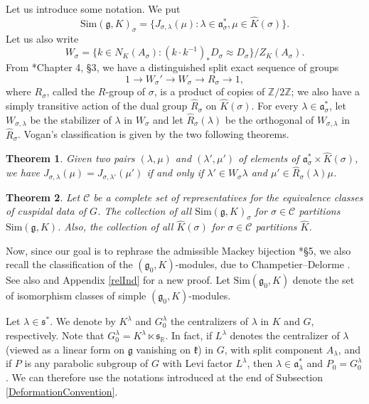 \documentclass{amsart}
\newtheorem{theorem}{Theorem}[section]
\theoremstyle{definition}
\begin{document}
Let us introduce some notation. We put \begin{equation}\label{notation_SgKsigma}\mathrm{Sim}(\mathfrak{g},K)_\sigma = \{J_{\sigma,\lambda}(\mu) : \lambda \in \mathfrak{a}_\sigma^*, \mu \in \widehat{K}(\sigma) \}.\end{equation}
Let us also write
\[W_\sigma = \{k \in N_K(A_\sigma) : (k\cdot k^{-1})_\ast D_\sigma \approx D_\sigma\}/Z_K(A_\sigma).\]
From \cite{VoganGreen}*{Chapter 4, §3}, we have a distinguished split exact sequence of groups
\[1 \to W_\sigma' \to W_\sigma \to R_\sigma \to 1, \]
where $R_\sigma$, called the $R$-group of $\sigma$, is a product of copies of $\mathbb{Z}/2\mathbb{Z}$; we also have a simply transitive action of the dual group $\hat{R}_\sigma$ on $\widehat{K}(\sigma)$. For every $\lambda \in \mathfrak{a}_\sigma^*$, let $W_{\sigma, \lambda}$ be the stabilizer of $\lambda$ in $W_\sigma$ and let $\hat{R}_\sigma(\lambda)$ be the orthogonal of $W_{\sigma, \lambda}$ in $\hat{R}_\sigma$. Vogan's classification is given by the two following theorems.

\begin{theorem}\label{vogan_classification} Given two pairs $(\lambda, \mu)$ and $(\lambda', \mu')$ of elements of $\mathfrak{a}_\sigma^* \times \widehat{K}(\sigma)$, we have $J_{\sigma,\lambda}(\mu) = J_{\sigma,\lambda'}(\mu')$ if and only if $\lambda' \in W_\sigma\lambda$ and $\mu' \in \hat{R}_\sigma(\lambda) \mu$.
\end{theorem}

\begin{theorem}\label{partition}
    Let $\mathcal{C}$ be a complete set of representatives for the equivalence classes of cuspidal data of $G$. The collection of all $\mathrm{Sim}(\mathfrak{g},K)_\sigma$ for $\sigma \in \mathcal{C}$ partitions $\mathrm{Sim}(\mathfrak{g},K)$. Also, the collection of all $\widehat{K}(\sigma)$ for $\sigma \in \mathcal{C}$ partitions $\widehat{K}$.
\end{theorem}

Now, since our goal is to rephrase the admissible Mackey bijection \cite{Afgoustidis1}*{§5}, we also recall the classification of the $(\mathfrak{g}_0,K)$-modules, due to Champetier--Delorme \cite{DelormeCh}. See also \cite{GaudillotEstrada} and Appendix \ref{relInd} for a new proof. Let $\mathrm{Sim}(\mathfrak{g}_0, K)$ denote the set of isomorphism classes of simple $(\mathfrak{g}_0, K)$-modules.

Let $\lambda\in \mathfrak{s}^*$. We denote by $K^\lambda$ and $G_0^\lambda$ the centralizers of $\lambda$ in $K$ and $G$, respectively. Note that $G_0^\lambda = K^\lambda \ltimes \mathfrak{s}_\mathbb{R}$. In fact, if $L^\lambda$ denotes the centralizer of $\lambda$ (viewed as a linear form on $\mathfrak{g}$ vanishing on $\mathfrak{k}$) in $G$, with split component $A_\lambda$, and if $P$ is any parabolic subgroup of $G$ with Levi factor $L^\lambda$, then $\lambda \in \mathfrak{a}_\lambda^*$ and $P_0 = G^\lambda_0$. We can therefore use the notations introduced at the end of Subsection \ref{DeformationConvention}.
\end{document}
